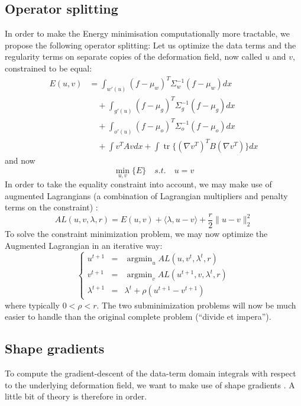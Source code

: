 \documentclass[a4paper,12pt]{article}
\DeclareMathOperator{\tr}{tr}
\DeclareMathOperator{\argmin}{argmin}
\begin{document}
\subsection{Operator splitting}
In order to make the Energy minimisation computationally more tractable, we propose the following operator splitting: Let us optimize the data terms and the regularity terms on separate copies of the deformation field, now called $u$ and $v$, constrained to be equal:
\begin{align}
E(u,v) &= \int_{w'(u)} (f-\mu_w)^T\Sigma_w^{-1}(f-\mu_w) dx\nonumber\\
&\quad +\int_{g'(u)} (f-\mu_g)^T\Sigma_g^{-1}(f-\mu_g) dx\\
&\quad +\int_{o'(u)} (f-\mu_o)^T\Sigma_o^{-1}(f-\mu_o) dx\nonumber\\
&\quad +\int v^T A v dx + \int \tr\{(\nabla v^T)^T B (\nabla v^T)\} dx\nonumber
\end{align}
and now
\begin{equation}
\min_{u,v} \{ E \} \quad s.t. \quad u = v
\end{equation}
In order to take the equality constraint into account, we may make use of augmented Lagrangians (a combination of Lagrangian multipliers and penalty terms on the constraint) \cite{Bertsekas1976,Glowinski1989,Nocedal2006}:
\begin{equation}
AL(u,v,\lambda,r) = E(u,v) + \langle \lambda, u-v \rangle + \frac{r}{2} \| u - v \|_2^2
\end{equation}
To solve the constraint minimization problem, we may now optimize the Augmented Lagrangian in an iterative way:
\begin{equation}
\left\lbrace \begin{array}{rcl}
u^{t+1} &=& \argmin_{u} AL(u,v^t,\lambda^t,r)\\
v^{t+1} &=& \argmin_{v} AL(u^{t+1},v,\lambda^t,r)\\
\lambda^{t+1} &=& \lambda^t + \rho(u^{t+1}-v^{t+1})
\end{array}\right.\end{equation}
where typically $0 < \rho < r$. The two subminimization problems will now be much easier to handle than the original complete problem (``divide et impera'').

\subsection{Shape gradients}
To compute the gradient-descent of the data-term domain integrals with respect to the underlying deformation field, we want to make use of shape gradients \cite{Jehan-Besson2003,Herbulot2006}. A little bit of theory is therefore in order.
\end{document}
